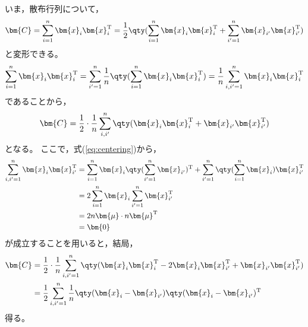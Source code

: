 \documentclass[class=jsarticle, crop=false, dvipdfmx, fleqn]{standalone}
\begin{document}
いま，散布行列について，
\begin{align*}
    \bm{C}
        = \sum_{i=1}^{n} \bm{x}_i \bm{x}_i^\mathrm{T}
        = \frac{1}{2} \qty(\sum_{i=1}^{n} \bm{x}_i \bm{x}_i^\mathrm{T} + \sum_{i'=1}^{n} \bm{x}_{i'} \bm{x}_{i'}^\mathrm{T})
\end{align*}
と変形できる。
\begin{equation*}
    \sum_{i=1}^{n} \bm{x}_i \bm{x}_i^\mathrm{T}
        = \sum_{i'=1}^{n} \frac{1}{n} \qty(\sum_{i=1}^{n} \bm{x}_i \bm{x}_i^\mathrm{T})
        = \frac{1}{n} \sum_{i, i'=1}^{n} \bm{x}_i \bm{x}_i^\mathrm{T}
\end{equation*}
であることから，
\begin{align*}
    \bm{C}
        = \frac{1}{2} \cdot \frac{1}{n} \sum_{i, i'}^{n} \qty(\bm{x}_i \bm{x}_{i}^\mathrm{T} + \bm{x}_{i'} \bm{x}_{i'}^\mathrm{T})
\end{align*}
となる。
ここで，式(\ref{eq:centering})から，
\begin{align*}
    \sum_{i, i'=1}^{n} \bm{x}_i \bm{x}_{i'}^\mathrm{T}
        & = \sum_{i=1}^{n} \bm{x}_i \qty(\sum_{i'=1}^{n} \bm{x}_{i'})^\mathrm{T} + \sum_{i'=1}^{n} \qty(\sum_{i=1}^{n} \bm{x}_i) \bm{x}_{i'}^\mathrm{T} \\
        & = 2 \sum_{i=1}^{n} \bm{x}_i \sum_{i'=1}^{n} \bm{x}_{i'}^\mathrm{T} \\
        & = 2 n\bm{\mu} \cdot n\bm{\mu}^\mathrm{T} \\
        & = \bm{0}
\end{align*}
が成立することを用いると，結局，
\begin{align}
    \bm{C}
        & = \frac{1}{2} \cdot \frac{1}{n} \sum_{i, i'=1}^{n} \qty(\bm{x}_i \bm{x}_{i}^\mathrm{T} - 2 \bm{x}_i \bm{x}_{i'}^\mathrm{T} + \bm{x}_{i'} \bm{x}_{i'}^\mathrm{T}) \notag \\
        & = \frac{1}{2} \sum_{i, i'=1}^{n} \frac{1}{n} \qty(\bm{x}_i - \bm{x}_{i'}) \qty(\bm{x}_i - \bm{x}_{i'})^\mathrm{T}
        \label{eq:C_pair}
\end{align}
得る。
\end{document}

